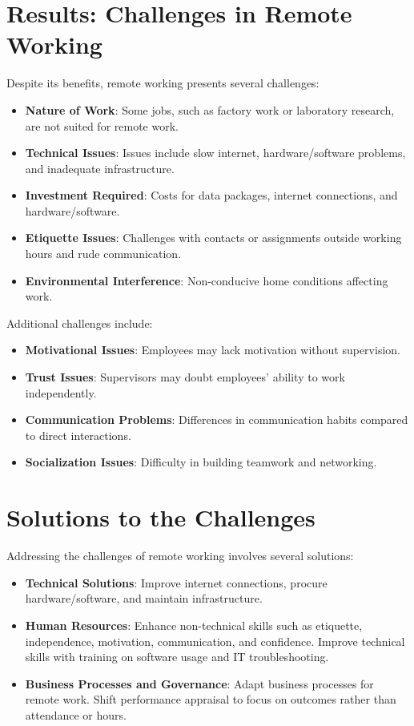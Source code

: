 \section{Results: Challenges in Remote Working}

Despite its benefits, remote working presents several challenges:
\begin{itemize}
	\item \textbf{Nature of Work}: Some jobs, such as factory work or laboratory research, are not suited for remote work.
	\item \textbf{Technical Issues}: Issues include slow internet, hardware/software problems, and inadequate infrastructure.
	\item \textbf{Investment Required}: Costs for data packages, internet connections, and hardware/software.
	\item \textbf{Etiquette Issues}: Challenges with contacts or assignments outside working hours and rude communication.
	\item \textbf{Environmental Interference}: Non-conducive home conditions affecting work.
\end{itemize}

Additional challenges include:
\begin{itemize}
	\item \textbf{Motivational Issues}: Employees may lack motivation without supervision.
	\item \textbf{Trust Issues}: Supervisors may doubt employees' ability to work independently.
	\item \textbf{Communication Problems}: Differences in communication habits compared to direct interactions.
	\item \textbf{Socialization Issues}: Difficulty in building teamwork and networking.
\end{itemize}

\section{Solutions to the Challenges}

Addressing the challenges of remote working involves several solutions:
\begin{itemize}
	\item \textbf{Technical Solutions}: Improve internet connections, procure hardware/software, and maintain infrastructure.
	\item \textbf{Human Resources}: Enhance non-technical skills such as etiquette, independence, motivation, communication, and confidence. Improve technical skills with training on software usage and IT troubleshooting.
	\item \textbf{Business Processes and Governance}: Adapt business processes for remote work. Shift performance appraisal to focus on outcomes rather than attendance or hours.
\end{itemize}

